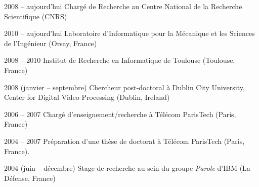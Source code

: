 \documentclass{simplecv}
\begin{document}
\begin{topic}
\item[2008 -- aujourd'hui] Charg\'{e} de Recherche au Centre National de la Recherche Scientifique (CNRS)


\begin{topic}
	\item[2010 -- aujourd'hui] Laboratoire d'Informatique pour la M\'{e}canique et les Sciences de l'Ing\'{e}nieur (Orsay, France)
	\item[2008 -- 2010] Institut de Recherche en Informatique de Toulouse (Toulouse, France)
\end{topic}



\item[2008 (janvier -- septembre)] Chercheur post-doctoral \`{a} Dublin City University,\\ Center for Digital Video Processing (Dublin, Ireland)


\item[2006 -- 2007] Charg\'{e} d'enseignement/recherche \`{a} T\'{e}l\'{e}com ParisTech (Paris, France)


\item[2004 -- 2007] Pr\'{e}paration d'une th\`{e}se de doctorat \`{a} T\'{e}l\'{e}com ParisTech (Paris, France).



\item[2004 (juin -- d\'{e}cembre)] Stage de recherche au sein du groupe \emph{Parole} d'IBM (La D\'{e}fense, France)

\end{topic}
\end{document}
